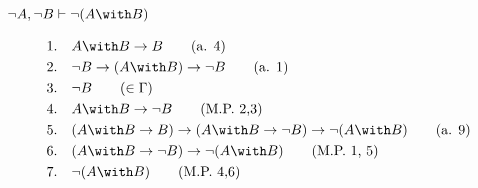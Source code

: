 \begin{exercise}[3.c]
    \(\neg A, \neg B \vdash \neg (A \with B)\)

    \begin{align*}
        1.\quad & A \with B \to B \tag{a. 4}                                                   \\
        2.\quad & \neg B \to (A \with B) \to \neg B \tag{a. 1}                                 \\
        3.\quad & \neg B \tag{\(\in \Gamma\)}                                                  \\
        4.\quad & A \with B \to \neg B \tag{M.P. 2,3}                                          \\
        5.\quad & (A \with B \to B) \to (A \with B \to \neg B) \to \neg (A \with B) \tag{a. 9} \\
        6.\quad & (A \with B \to \neg B) \to \neg (A \with B) \tag{M.P. 1, 5}                  \\
        7.\quad & \neg (A \with B) \tag{M.P. 4,6}                                              \\
    \end{align*}
\end{exercise}

